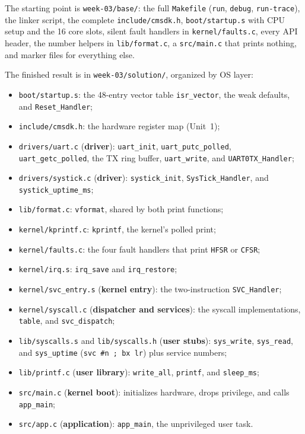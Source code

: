 The starting point is \texttt{week-03/base/}: the full \texttt{Makefile} (\texttt{run}, \texttt{debug}, \texttt{run-trace}), the linker script, the complete \texttt{include/cmsdk.h}, \texttt{boot/startup.s} with CPU setup and the 16 core slots, silent fault handlers in \texttt{kernel/faults.c}, every API header, the number helpers in \texttt{lib/format.c}, a \texttt{src/main.c} that prints nothing, and marker files for everything else.

The finished result is in \texttt{week-03/solution/}, organized by OS layer:
\begin{itemize}
  \item \texttt{boot/startup.s}: the 48-entry vector table \texttt{isr\_vector}, the weak defaults, and \texttt{Reset\_Handler};
  \item \texttt{include/cmsdk.h}: the hardware register map (Unit~1);
  \item \texttt{drivers/uart.c} (\textbf{driver}): \texttt{uart\_init}, \texttt{uart\_putc\_polled}, \texttt{uart\_getc\_polled}, the TX ring buffer, \texttt{uart\_write}, and \texttt{UART0TX\_Handler};
  \item \texttt{drivers/systick.c} (\textbf{driver}): \texttt{systick\_init}, \texttt{SysTick\_Handler}, and \texttt{systick\_uptime\_ms};
  \item \texttt{lib/format.c}: \texttt{vformat}, shared by both print functions;
  \item \texttt{kernel/kprintf.c}: \texttt{kprintf}, the kernel's polled print;
  \item \texttt{kernel/faults.c}: the four fault handlers that print \texttt{HFSR} or \texttt{CFSR};
  \item \texttt{kernel/irq.s}: \texttt{irq\_save} and \texttt{irq\_restore};
  \item \texttt{kernel/svc\_entry.s} (\textbf{kernel entry}): the two-instruction \texttt{SVC\_Handler};
  \item \texttt{kernel/syscall.c} (\textbf{dispatcher and services}): the syscall implementations, \texttt{table}, and \texttt{svc\_dispatch};
  \item \texttt{lib/syscalls.s} and \texttt{lib/syscalls.h} (\textbf{user stubs}): \texttt{sys\_write}, \texttt{sys\_read}, and \texttt{sys\_uptime} (\texttt{svc \#n ; bx lr}) plus service numbers;
  \item \texttt{lib/printf.c} (\textbf{user library}): \texttt{write\_all}, \texttt{printf}, and \texttt{sleep\_ms};
  \item \texttt{src/main.c} (\textbf{kernel boot}): initializes hardware, drops privilege, and calls \texttt{app\_main};
  \item \texttt{src/app.c} (\textbf{application}): \texttt{app\_main}, the unprivileged user task.
\end{itemize}

